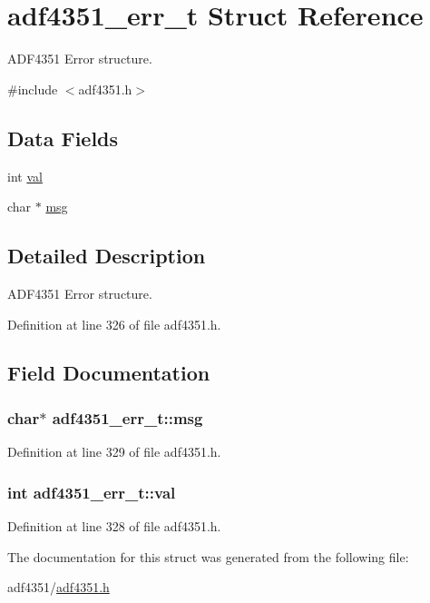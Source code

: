 \hypertarget{structadf4351__err__t}{}\section{adf4351\+\_\+err\+\_\+t Struct Reference}
\label{structadf4351__err__t}


A\+D\+F4351 Error structure.  




{\ttfamily \#include $<$adf4351.\+h$>$}

\subsection*{Data Fields}
\begin{DoxyCompactItemize}
\item 
int \hyperlink{structadf4351__err__t_ab5be0db827951d8d9f360b7b31238d7c}{val}
\item 
char $\ast$ \hyperlink{structadf4351__err__t_abbb87d190201d79e2ca442403d12bd3d}{msg}
\end{DoxyCompactItemize}


\subsection{Detailed Description}
A\+D\+F4351 Error structure. 

Definition at line 326 of file adf4351.\+h.



\subsection{Field Documentation}
\subsubsection[{\texorpdfstring{msg}{msg}}]{\setlength{\rightskip}{0pt plus 5cm}char$\ast$ adf4351\+\_\+err\+\_\+t\+::msg}\hypertarget{structadf4351__err__t_abbb87d190201d79e2ca442403d12bd3d}{}\label{structadf4351__err__t_abbb87d190201d79e2ca442403d12bd3d}


Definition at line 329 of file adf4351.\+h.

\subsubsection[{\texorpdfstring{val}{val}}]{\setlength{\rightskip}{0pt plus 5cm}int adf4351\+\_\+err\+\_\+t\+::val}\hypertarget{structadf4351__err__t_ab5be0db827951d8d9f360b7b31238d7c}{}\label{structadf4351__err__t_ab5be0db827951d8d9f360b7b31238d7c}


Definition at line 328 of file adf4351.\+h.



The documentation for this struct was generated from the following file\+:\begin{DoxyCompactItemize}
\item 
adf4351/\hyperlink{adf4351_8h}{adf4351.\+h}\end{DoxyCompactItemize}
